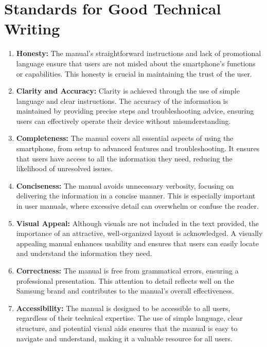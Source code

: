 \documentclass{article}
\begin{document}
\section*{Standards for Good Technical Writing}
\begin{enumerate}
    \item \textbf{Honesty:} The manual’s straightforward instructions and lack of promotional language ensure that users are not misled about the smartphone’s functions or capabilities. This honesty is crucial in maintaining the trust of the user.
    
    \item \textbf{Clarity and Accuracy:} Clarity is achieved through the use of simple language and clear instructions. The accuracy of the information is maintained by providing precise steps and troubleshooting advice, ensuring users can effectively operate their device without misunderstanding.
    
    \item \textbf{Completeness:} The manual covers all essential aspects of using the smartphone, from setup to advanced features and troubleshooting. It ensures that users have access to all the information they need, reducing the likelihood of unresolved issues.
    
    \item \textbf{Conciseness:} The manual avoids unnecessary verbosity, focusing on delivering the information in a concise manner. This is especially important in user manuals, where excessive detail can overwhelm or confuse the reader.
    
    \item \textbf{Visual Appeal:} Although visuals are not included in the text provided, the importance of an attractive, well-organized layout is acknowledged. A visually appealing manual enhances usability and ensures that users can easily locate and understand the information they need.
    
    \item \textbf{Correctness:} The manual is free from grammatical errors, ensuring a professional presentation. This attention to detail reflects well on the Samsung brand and contributes to the manual’s overall effectiveness.
    
    \item \textbf{Accessibility:} The manual is designed to be accessible to all users, regardless of their technical expertise. The use of simple language, clear structure, and potential visual aids ensures that the manual is easy to navigate and understand, making it a valuable resource for all users.
\end{enumerate}
\end{document}
